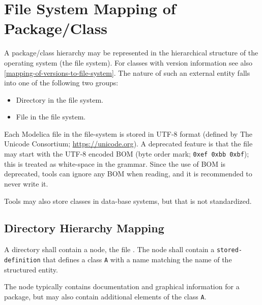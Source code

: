 \section{File System Mapping of Package/Class}\label{mapping-package-class-structures-to-a-hierarchical-file-system}\label{file-system-mapping-of-package-class}

A package/class hierarchy may be represented in the hierarchical structure of the operating system (the file system).
For classes with version information see also \cref{mapping-of-versions-to-file-system}.
The nature of such an external entity falls into one of the following two groups:
\begin{itemize}
\item
  Directory in the file system.
\end{itemize}

\begin{itemize}
\item
  File in the file system.
\end{itemize}

Each Modelica file in the file-system is stored in UTF-8 format (defined by The Unicode Consortium; \url{https://unicode.org}).  A deprecated feature is that the file may start with the UTF-8 encoded BOM (byte order mark; \lstinline!0xef 0xbb 0xbf!); this is treated as white-space in the grammar.  Since the use of BOM is deprecated, tools can ignore any BOM when reading, and it is recommended to never write it.

\begin{nonnormative}
Tools may also store classes in data-base systems, but that is not standardized.
\end{nonnormative}

\subsection{Directory Hierarchy Mapping}\label{mapping-a-package-class-hierarchy-into-a-directory-hierarchy-structured-entity}\label{directory-hierarchy-mapping}

A directory shall contain a node, the file .
The node shall contain a \lstinline[language=grammar]!stored-definition! that defines a class \lstinline!A! with a name matching the name of the structured entity.

\begin{nonnormative}
The node typically contains documentation and graphical information for a package, but may also contain additional elements of the class \lstinline!A!.
\end{nonnormative}

